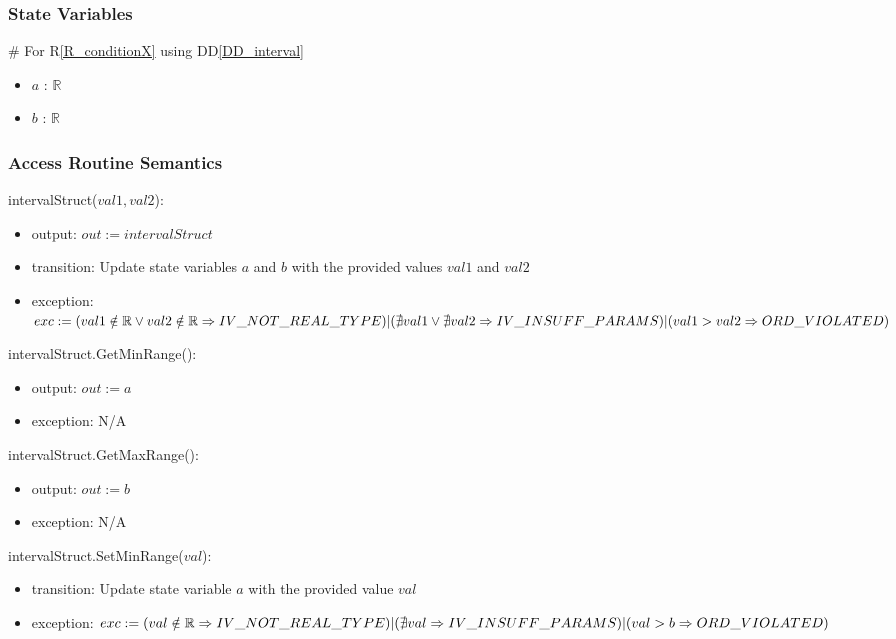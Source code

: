 \documentclass[12pt, titlepage]{article}
\newcommand{\rref}[1]{R\ref{#1}}
\newcommand{\ddref}[1]{DD\ref{#1}}
\begin{document}
\subsubsection{State Variables}

\# For \rref{R_conditionX} using \ddref{DD_interval}
\begin{itemize}
	\item $a$ : $\mathbb{R}$
	\item $b$ : $\mathbb{R}$
\end{itemize}

\subsubsection{Access Routine Semantics}

\noindent intervalStruct($val1, val2$):
\begin{itemize}
	\item output: $out := intervalStruct$
	\item transition: Update state variables $a$ and $b$ with the provided 
	values $val1$ and $val2$
	\item exception: $exc := \\
	(val1 \notin \mathbb{R} \vee val2 \notin \mathbb{R} \Rightarrow 
	IV\_NOT\_REAL\_TYPE) \\
	|\\
	(\nexists val1 \vee \nexists val2 \Rightarrow IV\_INSUFF\_PARAMS)\\
	|\\
	(val1 > val2 \Rightarrow ORD\_VIOLATED)$
\end{itemize}

\noindent intervalStruct.GetMinRange():
\begin{itemize}
	\item output: $out := a$
	\item exception: N/A
\end{itemize}

\noindent intervalStruct.GetMaxRange():
\begin{itemize}
	\item output: $out := b$
	\item exception: N/A
\end{itemize}

\noindent intervalStruct.SetMinRange($val$):
\begin{itemize}
	\item transition: Update state variable $a$ with the provided value $val$
	\item exception: $exc := \\
	(val \notin \mathbb{R} \Rightarrow IV\_NOT\_REAL\_TYPE) \\
	|\\
	(\nexists val \Rightarrow IV\_INSUFF\_PARAMS) \\
	|\\
	(val > b \Rightarrow ORD\_VIOLATED)$
\end{itemize}
\end{document}
